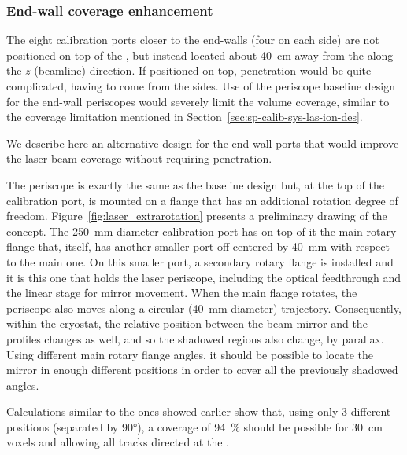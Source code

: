 


\subsubsection{End-wall coverage enhancement}

The eight calibration ports closer to the end-walls (four on each side) are not positioned on top of the , but instead located about \SI{40}{\cm} away from the  along the $z$ (beamline) direction. If positioned on top,  penetration would be quite complicated, having to come from the sides. Use of the periscope baseline design for the end-wall periscopes would severely limit the volume coverage, similar to the coverage limitation mentioned in Section~\ref{sec:sp-calib-sys-las-ion-des}.

We describe here an alternative design for the end-wall ports that would improve the laser beam coverage without requiring  penetration.

The periscope is exactly the same as the baseline design but, at the top of the calibration port, is mounted on a flange that has an additional rotation degree of freedom. Figure~\ref{fig:laser_extrarotation} presents a preliminary drawing of the concept. The \SI{250}{\milli\m} diameter calibration port has on top of it the main rotary flange that, itself, has another smaller port off-centered by \SI{40}{\milli\m} with respect to the main one. On this smaller port, a secondary rotary flange is installed and it is this one that holds the laser periscope, including the optical feedthrough and the linear stage for mirror movement. When the main flange rotates, the periscope also moves along a circular (\SI{40}{\milli\m} diameter) trajectory. Consequently, within the cryostat, the relative position between the beam mirror and the  profiles changes as well, and so the shadowed regions also change, by parallax. Using different main rotary flange angles, it should be possible to locate the mirror in enough different positions in order to cover all the previously shadowed angles.

Calculations similar to the ones showed earlier show that, using only \num{3} different positions (separated by \ang{90}), a coverage of \SI{94}{\%} should be possible for \SI{30}{\cm} voxels and allowing all tracks directed at the .

